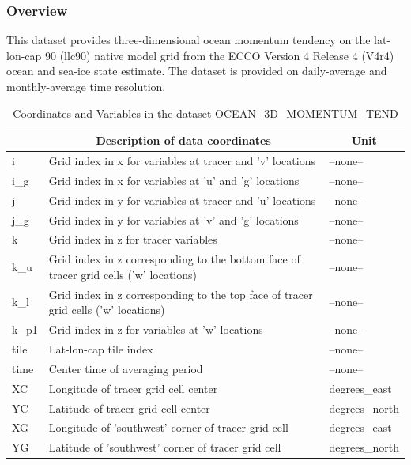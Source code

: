 \subsubsection{Overview}
This dataset provides three-dimensional ocean momentum tendency on the lat-lon-cap 90 (llc90) native model grid from the ECCO Version 4 Release 4 (V4r4) ocean and sea-ice state estimate. The dataset is provided on daily-average and monthly-average time resolution. 
\begin{longtable}{|m{}|m{}|m{}|}
\caption{Coordinates and Variables in the dataset OCEAN\_3D\_MOMENTUM\_TEND}
\label{tab:table-OCEAN_3D_MOMENTUM_TEND-fields} \\ 
\hline \endhead \hline \endfoot
\rowcolor{lightgray} \multicolumn{1}{|c|}{\textbf{Coordinates}} & \multicolumn{1}{|c|}{\textbf{Description of data coordinates}} &  \multicolumn{1}{|c|}{\textbf{Unit}}\\ \hline
i &Grid index in x for variables at tracer and 'v' locations &--none--  \\ \hline
i\_g &Grid index in x for variables at 'u' and 'g' locations &--none--  \\ \hline
j &Grid index in y for variables at tracer and 'u' locations &--none--  \\ \hline
j\_g &Grid index in y for variables at 'v' and 'g' locations &--none--  \\ \hline
k &Grid index in z for tracer variables &--none--  \\ \hline
k\_u &Grid index in z corresponding to the bottom face of tracer grid cells ('w' locations) &--none--  \\ \hline
k\_l &Grid index in z corresponding to the top face of tracer grid cells ('w' locations) &--none--  \\ \hline
k\_p1 &Grid index in z for variables at 'w' locations &--none--  \\ \hline
tile &Lat-lon-cap tile index &--none--  \\ \hline
time &Center time of averaging period &--none--  \\ \hline
XC &Longitude of tracer grid cell center &degrees\_east  \\ \hline
YC &Latitude of tracer grid cell center &degrees\_north  \\ \hline
XG &Longitude of 'southwest' corner of tracer grid cell &degrees\_east  \\ \hline
YG &Latitude of 'southwest' corner of tracer grid cell &degrees\_north  \\ \hline

\end{longtable}
